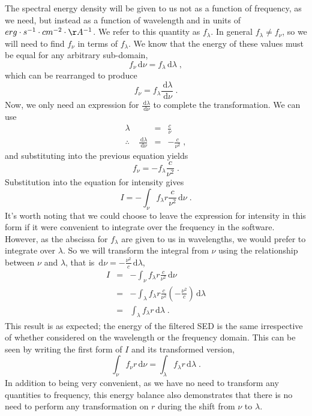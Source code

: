 \documentclass[12pt]{scrartcl}
\newcommand{\dx}[1]{\ensuremath{\,\mathrm{d}#1}}
\begin{document}
The spectral energy density will be given
to us not as a function of frequency, as we need, but instead as
a function of wavelength and in units of
$erg\cdot s^{-1}\cdot cm^{-2}\cdot \AA^{-1}$. We refer to this quantity as
$f_\lambda$. In general $f_\lambda \ne f_\nu$, so we
will need to find $f_\nu$ in terms of $f_\lambda$.
We know that the energy of these values
must be equal for any arbitrary sub-domain,
\[ f_\nu \dx{\nu} = f_\lambda \dx{\lambda} \; , \]
which can be rearranged to produce
\[ f_\nu = f_\lambda \frac{\dx{\lambda}}{\dx{\nu}} \; . \]
Now, we only need an expression for $\frac{\dx{\lambda}}{\dx{\nu}}$
to complete the transformation. We can use
\begin{eqnarray*}
\lambda & = & \frac{c}{\nu} \\
\therefore \;\;\;\; \frac{\dx{\lambda}}{\dx{\nu}} & = & -\frac{c}{\nu^2} \; ,
\end{eqnarray*}
and substituting into the previous equation yields
\[ f_\nu = -f_\lambda \frac{c}{\nu^2} \; . \]
Substitution into the equation for intensity gives
\[ I = -\int_\nu f_\lambda r \frac{c}{\nu^2} \dx{\nu} \; . \]
It's worth noting that we could choose to leave the expression
for intensity in this form if it were convenient to integrate
over the frequency in the software. However, as the abscissa for
$f_\lambda$ are given to us in wavelengths, we would prefer to
integrate over $\lambda$. So
we will transform the integral from $\nu$ using the relationship
between $\nu$ and $\lambda$, that is $\dx{\nu} = -\frac{\nu^2}{c}\dx{\lambda}$,
\begin{eqnarray*}
I & = & -\int_\nu f_\lambda r \frac{c}{\nu^2} \dx{\nu} \\
& = & -\int_\lambda f_\lambda r \frac{c}{\nu^2} \left(-\frac{\nu^2}{c}\right) \dx{\lambda} \\
& = & \int_\lambda f_\lambda r \dx{\lambda} \; .
\end{eqnarray*}
This result is as expected; the energy of the filtered SED is the same
irrespective of whether considered on the wavelength or the
frequency domain. This can be seen by writing the first form of
$I$ and its transformed version,
\[ \int_\nu f_\nu r \dx{\nu} = \int_\lambda f_\lambda r \dx{\lambda} \; . \]
In addition to being very convenient, as we have no need
to transform any quantities to frequency, this energy balance also
demonstrates that there is no need to perform any transformation on
$r$ during the shift from $\nu$ to $\lambda$.
\end{document}

